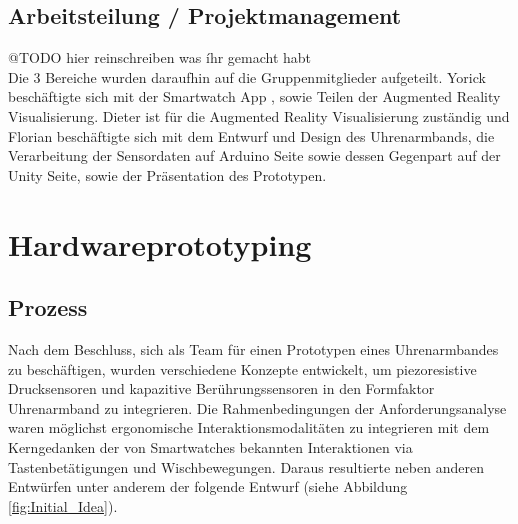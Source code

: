 \documentclass[12pt, a4paper]{article}
\begin{document}
\subsection{Arbeitsteilung / Projektmanagement}

@TODO hier reinschreiben was íhr gemacht habt \\

Die 3 Bereiche wurden daraufhin auf die Gruppenmitglieder aufgeteilt. Yorick beschäftigte sich mit der Smartwatch App , sowie Teilen der Augmented Reality Visualisierung. Dieter ist für die Augmented Reality Visualisierung zuständig und Florian beschäftigte sich mit dem Entwurf und Design des Uhrenarmbands, die Verarbeitung der Sensordaten auf Arduino Seite sowie dessen Gegenpart auf der Unity Seite, sowie der Präsentation des Prototypen.

\newpage

\section{Hardwareprototyping}
\label{sec:Hardwareprototyping}

\subsection{Prozess}

Nach dem Beschluss, sich als Team für einen Prototypen eines Uhrenarmbandes zu beschäftigen, wurden verschiedene Konzepte entwickelt, um piezoresistive Drucksensoren und kapazitive Berührungssensoren in den Formfaktor Uhrenarmband zu integrieren. Die Rahmenbedingungen der Anforderungsanalyse waren möglichst ergonomische Interaktionsmodalitäten zu integrieren mit dem Kerngedanken der von Smartwatches bekannten Interaktionen via Tastenbetätigungen und Wischbewegungen. Daraus resultierte neben anderen Entwürfen unter anderem der folgende Entwurf (siehe Abbildung \ref{fig:Initial_Idea}).
\end{document}

